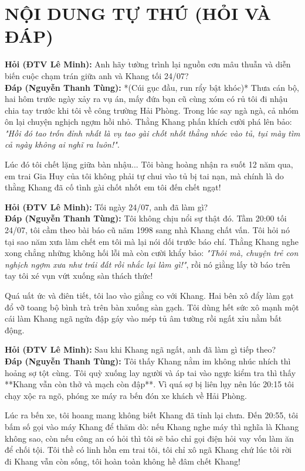 \documentclass[12pt,a4paper]{article}
\begin{document}
\section*{NỘI DUNG TỰ THÚ (HỎI VÀ ĐÁP)}

\noindent \textbf{Hỏi (ĐTV Lê Minh):} Anh hãy tường trình lại nguồn cơn mâu thuẫn và diễn biến cuộc chạm trán giữa anh và Khang tối 24/07?\\
\textbf{Đáp (Nguyễn Thanh Tùng):} *(Cúi gục đầu, run rẩy bật khóc)* Thưa cán bộ, hai hôm trước ngày xảy ra vụ án, mấy đứa bạn cũ cùng xóm có rủ tôi đi nhậu chia tay trước khi tôi về công trường Hải Phòng. Trong lúc say ngà ngà, cả nhóm ôn lại chuyện nghịch ngợm hồi nhỏ. Thằng Khang phấn khích cười phá lên bảo: \textit{"Hồi đó tao trốn đỉnh nhất là vụ tao gài chốt nhốt thằng nhóc vào tủ, tụi mày tìm cả ngày không ai nghĩ ra luôn!"}.

Lúc đó tôi chết lặng giữa bàn nhậu... Tôi bàng hoàng nhận ra suốt 12 năm qua, em trai Gia Huy của tôi không phải tự chui vào tủ bị tai nạn, mà chính là do thằng Khang đã cố tình gài chốt nhốt em tôi đến chết ngạt!

\noindent \textbf{Hỏi (ĐTV Lê Minh):} Tối ngày 24/07, anh đã làm gì?\\
\textbf{Đáp (Nguyễn Thanh Tùng):} Tôi không chịu nổi sự thật đó. Tầm 20:00 tối 24/07, tôi cầm theo bài báo cũ năm 1998 sang nhà Khang chất vấn. Tôi hỏi nó tại sao năm xưa làm chết em tôi mà lại nói dối trước báo chí. Thằng Khang nghe xong chẳng những không hối lỗi mà còn cười khẩy bảo: \textit{"Thôi mà, chuyện trẻ con nghịch ngợm xưa như trái đất rồi nhắc lại làm gì!"}, rồi nó giằng lấy tờ báo trên tay tôi xé vụn vứt xuống sàn thách thức!

Quá uất ức và điên tiết, tôi lao vào giằng co với Khang. Hai bên xô đẩy làm gạt đổ vỡ toang bộ bình trà trên bàn xuống sàn gạch. Tôi dùng hết sức xô mạnh một cái làm Khang ngã ngửa đập gáy vào mép tủ âm tường rồi ngất xỉu nằm bất động.

\noindent \textbf{Hỏi (ĐTV Lê Minh):} Sau khi Khang ngã ngất, anh đã làm gì tiếp theo?\\
\textbf{Đáp (Nguyễn Thanh Tùng):} Tôi thấy Khang nằm im không nhúc nhích thì hoảng sợ tột cùng. Tôi quỳ xuống lay người và áp tai vào ngực kiểm tra thì thấy **Khang vẫn còn thở và mạch còn đập**. Vì quá sợ bị liên lụy nên lúc 20:15 tôi chạy xộc ra ngõ, phóng xe máy ra bến đón xe khách về Hải Phòng. 

Lúc ra bến xe, tôi hoang mang không biết Khang đã tỉnh lại chưa. Đến 20:55, tôi bấm số gọi vào máy Khang để thăm dò: nếu Khang nghe máy thì nghĩa là Khang không sao, còn nếu công an có hỏi thì tôi sẽ bảo chỉ gọi điện hỏi vay vốn làm ăn để chối tội. Tôi thề có linh hồn em trai tôi, tôi chỉ xô ngã Khang chứ lúc tôi rời đi Khang vẫn còn sống, tôi hoàn toàn không hề đâm chết Khang!
\end{document}
